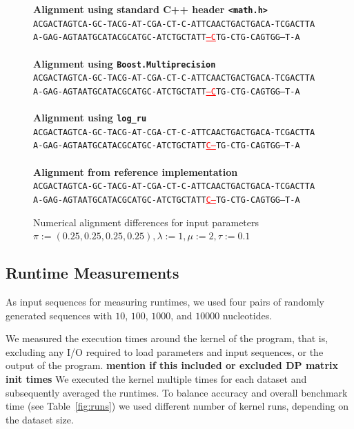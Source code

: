 \documentclass[runningheads,a4paper]{llncs}
\begin{document}
\begin{figure}

\textbf{Alignment using standard C++ header \texttt{<math.h>}}
~
\\
\texttt{ACGACTAGTCA-GC-TACG-AT-CGA-CT-C-ATTCAACTGACTGACA-TCGACTTA} \\
\texttt{A-GAG-AGTAATGCATACGCATGC-ATCTGCTATT\textcolor{red}{\underline{---C}}TG-CTG-CAGTGG--T-A}
\\~\\
\textbf{Alignment using \texttt{Boost.Multiprecision}}
~
\\
\texttt{ACGACTAGTCA-GC-TACG-AT-CGA-CT-C-ATTCAACTGACTGACA-TCGACTTA} \\
\texttt{A-GAG-AGTAATGCATACGCATGC-ATCTGCTATT\textcolor{red}{\underline{---C}}TG-CTG-CAGTGG--T-A}
\\~\\
\textbf{Alignment using \texttt{log\_ru}}
~
\\
\texttt{ACGACTAGTCA-GC-TACG-AT-CGA-CT-C-ATTCAACTGACTGACA-TCGACTTA} \\
\texttt{A-GAG-AGTAATGCATACGCATGC-ATCTGCTATT\textcolor{red}{\underline{C---}}TG-CTG-CAGTGG--T-A}
\\~\\
\textbf{Alignment from reference implementation}
~
\\
\texttt{ACGACTAGTCA-GC-TACG-AT-CGA-CT-C-ATTCAACTGACTGACA-TCGACTTA} \\
\texttt{A-GAG-AGTAATGCATACGCATGC-ATCTGCTATT\textcolor{red}{\underline{C---}}TG-CTG-CAGTGG--T-A}

\caption{Numerical alignment differences for input parameters $\pi:=(0.25,0.25,0.25,0.25), \lambda:=1, \mu:= 2, \tau := 0.1$}
\label{fig:alignments}
\end{figure}

\subsection{Runtime Measurements}
\label{team2-runtimes}

As input sequences for measuring runtimes,  we used four pairs of randomly generated sequences with $10$, $100$, $1000$, and $10000$ nucleotides. 

We measured the execution times around the kernel of the program, that is, excluding any I/O required to load parameters and input sequences, or the output of the program. 
{\bf mention if this included or excluded DP matrix init times}
We executed the kernel multiple times for each dataset and subsequently averaged the runtimes. 
To balance accuracy and overall benchmark time (see Table~\ref{fig:runs}) we used different number of kernel runs, depending on the dataset size.
\end{document}
